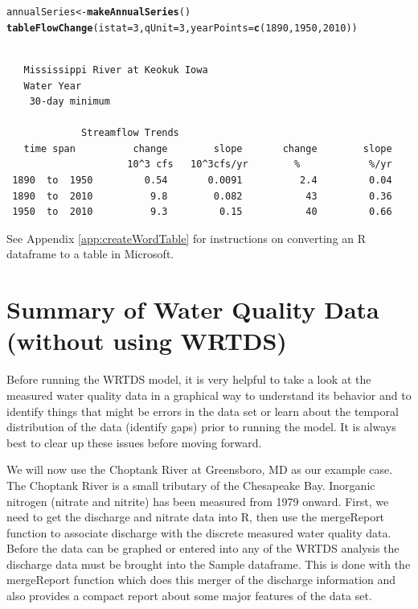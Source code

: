 \documentclass[a4paper,11pt]{article}\usepackage{graphicx, color}
\makeatletter
\newcommand{\hlfunctioncall}[1]{\textcolor[rgb]{0.501960784313725,0,0.329411764705882}{\textbf{#1}}}%
\newenvironment{kframe}{%
 \def\at@end@of@kframe{}%
 \ifinner\ifhmode%
  \def\at@end@of@kframe{\end{minipage}}%
  \begin{minipage}{\columnwidth}%
 \fi\fi%
 \def\FrameCommand##1{\hskip\@totalleftmargin \hskip-\fboxsep
 \colorbox{shadecolor}{##1}\hskip-\fboxsep
     \hskip-\linewidth \hskip-\@totalleftmargin \hskip\columnwidth}%
 \MakeFramed {\advance\hsize-\width
   \@totalleftmargin\z@ \linewidth\hsize
   \@setminipage}}%
 {\par\unskip\endMakeFramed%
 \at@end@of@kframe}
\newenvironment{knitrout}{}{} %
\makeatother
\begin{document}
\begin{knitrout}
\color{fgcolor}\begin{kframe}
\begin{alltt}
annualSeries <- \hlfunctioncall{makeAnnualSeries}()
\hlfunctioncall{tableFlowChange}(istat=3, qUnit=3,yearPoints=\hlfunctioncall{c}(1890,1950,2010))
\end{alltt}
\begin{verbatim}

   Mississippi River at Keokuk Iowa
   Water Year
    30-day minimum 

             Streamflow Trends
   time span          change        slope       change        slope
                     10^3 cfs   10^3cfs/yr        %            %/yr
 1890  to  1950         0.54       0.0091          2.4         0.04
 1890  to  2010          9.8        0.082           43         0.36
 1950  to  2010          9.3         0.15           40         0.66
\end{verbatim}
\end{kframe}
\end{knitrout}


See Appendix \ref{app:createWordTable} for instructions on converting an R dataframe to a table in Microsoft. 

\FloatBarrier


\section{Summary of Water Quality Data (without using WRTDS)}
\label{sec:wqa}
\FloatBarrier

Before running the WRTDS model, it is very helpful to take a look at the measured water quality data in a graphical way to understand its behavior and to identify things that might be errors in the data set or learn about the temporal distribution of the data (identify gaps) prior to running the model.  It is always best to clear up these issues before moving forward.

We will now use the Choptank River at Greensboro, MD as our example case. The Choptank River is a small tributary of the Chesapeake Bay. Inorganic nitrogen (nitrate and nitrite) has been measured from 1979 onward. First, we need to get the discharge and nitrate data into R, then use the mergeReport function to associate discharge with the discrete measured water quality data. Before the data can be graphed or entered into any of the WRTDS analysis the discharge data must be brought into the Sample dataframe.  This is done with the mergeReport function which does this merger of the discharge information and also provides a compact report about some major features of the data set.
\end{document}
